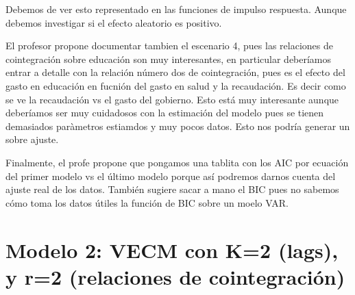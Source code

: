 \documentclass[]{book}
\newenvironment{Shaded}{\begin{snugshade}}{\end{snugshade}}
\newcommand{\KeywordTok}[1]{\textcolor[rgb]{0.13,0.29,0.53}{\textbf{#1}}}
\newcommand{\DataTypeTok}[1]{\textcolor[rgb]{0.13,0.29,0.53}{#1}}
\newcommand{\DecValTok}[1]{\textcolor[rgb]{0.00,0.00,0.81}{#1}}
\newcommand{\StringTok}[1]{\textcolor[rgb]{0.31,0.60,0.02}{#1}}
\newcommand{\CommentTok}[1]{\textcolor[rgb]{0.56,0.35,0.01}{\textit{#1}}}
\newcommand{\OperatorTok}[1]{\textcolor[rgb]{0.81,0.36,0.00}{\textbf{#1}}}
\newcommand{\NormalTok}[1]{#1}
\theoremstyle{definition}
\theoremstyle{definition}
\theoremstyle{definition}
\theoremstyle{remark}
\begin{document}
Debemos de ver esto representado en las funciones de impulso respuesta.
Aunque debemos investigar si el efecto aleatorio es positivo.

El profesor propone documentar tambien el escenario 4, pues las
relaciones de cointegración sobre educación son muy interesantes, en
particular deberíamos entrar a detalle con la relación número dos de
cointegración, pues es el efecto del gasto en educación en fucnión del
gasto en salud y la recaudación. Es decir como se ve la recaudación vs
el gasto del gobierno. Esto está muy interesante aunque deberíamos ser
muy cuidadosos con la estimación del modelo pues se tienen demasiados
paràmetros estiamdos y muy pocos datos. Esto nos podría generar un sobre
ajuste.

Finalmente, el profe propone que pongamos una tablita con los AIC por
ecuación del primer modelo vs el último modelo porque así podremos
darnos cuenta del ajuste real de los datos. También sugiere sacar a mano
el BIC pues no sabemos cómo toma los datos útiles la función de BIC
sobre un moelo VAR.

\section{Modelo 2: VECM con K=2 (lags), y r=2 (relaciones de
cointegración)}\label{modelo-2-vecm-con-k2-lags-y-r2-relaciones-de-cointegracion}

\begin{Shaded}
\end{Shaded}
\end{document}
